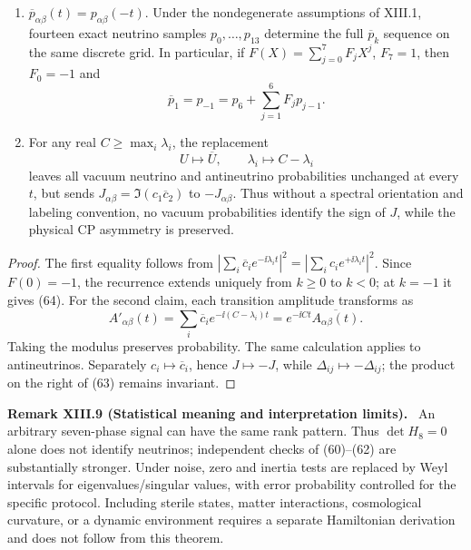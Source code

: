 \documentclass[11pt,a4paper,oneside]{book}
\newcommand{\statement}[3]{\par\medskip\noindent\textbf{#1 #2 (#3).}\ }
\begin{document}
\begin{enumerate}[label=(\roman*)]
\item $\overline p_{\alpha\beta}(t)=p_{\alpha\beta}(-t)$. Under the nondegenerate assumptions of XIII.1, fourteen exact neutrino samples $p_0,\ldots,p_{13}$ determine the full $\overline p_k$ sequence on the same discrete grid. In particular, if $F(X)=\sum_{j=0}^7F_jX^j$, $F_7=1$, then $F_0=-1$ and
\begin{equation}\overline p_1=p_{-1}=p_6+\sum_{j=1}^6F_jp_{j-1}.\tag{64}\end{equation}
\item For any real $C\ge\max_i\lambda_i$, the replacement
\begin{equation}U\longmapsto\overline U,\qquad\lambda_i\longmapsto C-\lambda_i\tag{65}\end{equation}
leaves all vacuum neutrino and antineutrino probabilities unchanged at every $t$, but sends $J_{\alpha\beta}=\Im(c_1\overline c_2)$ to $-J_{\alpha\beta}$. Thus without a spectral orientation and labeling convention, no vacuum probabilities identify the sign of $J$, while the physical CP asymmetry is preserved.
\end{enumerate}
\begin{proof}The first equality follows from $|\sum_i\overline c_i e^{-\ii\lambda_it}|^2=|\sum_i c_i e^{+\ii\lambda_it}|^2$. Since $F(0)=-1$, the recurrence extends uniquely from $k\ge0$ to $k<0$; at $k=-1$ it gives (64). For the second claim, each transition amplitude transforms as
\[A'_{\alpha\beta}(t)=\sum_i\overline c_i e^{-\ii(C-\lambda_i)t}=e^{-\ii Ct}\overline{A_{\alpha\beta}(t)}.\]
Taking the modulus preserves probability. The same calculation applies to antineutrinos. Separately $c_i\mapsto\overline c_i$, hence $J\mapsto-J$, while $\Delta_{ij}\mapsto-\Delta_{ij}$; the product on the right of (63) remains invariant.\end{proof}
\statement{Remark}{XIII.9}{Statistical meaning and interpretation limits} An arbitrary seven-phase signal can have the same rank pattern. Thus $\det H_8=0$ alone does not identify neutrinos; independent checks of (60)--(62) are substantially stronger. Under noise, zero and inertia tests are replaced by Weyl intervals for eigenvalues/singular values, with error probability controlled for the specific protocol. Including sterile states, matter interactions, cosmological curvature, or a dynamic environment requires a separate Hamiltonian derivation and does not follow from this theorem.
\end{document}
